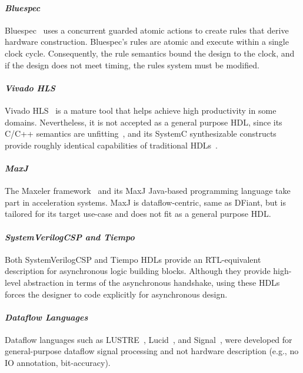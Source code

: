 \paragraph*{\bf \em Bluespec} 
Bluespec~\cite{nikhil2004bluespec} uses a concurrent guarded atomic actions to create rules that derive hardware construction. Bluespec's rules are atomic and execute within a single clock cycle. Consequently, the rule semantics bound the design to the clock, and if the design does not meet timing, the rules system must be modified. 

\paragraph*{\bf \em Vivado HLS} 
Vivado HLS~\cite{Vivado2012} is a mature tool that helps achieve high productivity in some domains. Nevertheless, it is not accepted as a general purpose HDL, since its C/C++ semantics are unfitting~\cite{Zhao2017}, and its SystemC synthesizable constructs provide roughly identical capabilities of traditional HDLs~\cite{gajski2010input}. 

\paragraph*{\bf \em MaxJ} 
The Maxeler framework~\cite{Pell2011} and its MaxJ Java-based programming language take part in acceleration systems. MaxJ is dataflow-centric, same as DFiant, but is tailored for its target use-case and does not fit as a general purpose HDL.

\paragraph*{\bf \em SystemVerilogCSP and Tiempo} 
Both SystemVerilogCSP \cite{saifhashemi2011systemverilogcsp} and Tiempo \cite{renaudin2012tiempo} HDLs provide an RTL-equivalent description for asynchronous logic building blocks. Although they provide high-level abstraction in terms of the asynchronous handshake, using these HDLs forces the designer to code explicitly for asynchronous design.

\paragraph*{\bf \em Dataflow Languages} 
Dataflow languages such as LUSTRE~\cite{Caspi1987}, Lucid~\cite{wadge1985lucid}, and Signal~\cite{le1986signal}, were developed for general-purpose dataflow signal processing and not hardware description (e.g., no IO annotation, bit-accuracy).


